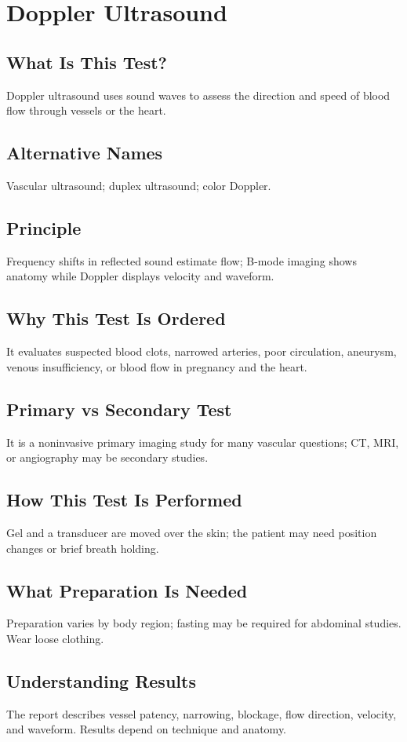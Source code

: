 \chapter{Doppler Ultrasound}
\section*{What Is This Test?} Doppler ultrasound uses sound waves to assess the direction and speed of blood flow through vessels or the heart.
\section*{Alternative Names} Vascular ultrasound; duplex ultrasound; color Doppler.
\section*{Principle} Frequency shifts in reflected sound estimate flow; B-mode imaging shows anatomy while Doppler displays velocity and waveform.
\section*{Why This Test Is Ordered} It evaluates suspected blood clots, narrowed arteries, poor circulation, aneurysm, venous insufficiency, or blood flow in pregnancy and the heart.
\section*{Primary vs Secondary Test} It is a noninvasive primary imaging study for many vascular questions; CT, MRI, or angiography may be secondary studies.
\section*{How This Test Is Performed} Gel and a transducer are moved over the skin; the patient may need position changes or brief breath holding.
\section*{What Preparation Is Needed} Preparation varies by body region; fasting may be required for abdominal studies. Wear loose clothing.
\section*{Understanding Results} The report describes vessel patency, narrowing, blockage, flow direction, velocity, and waveform. Results depend on technique and anatomy.
